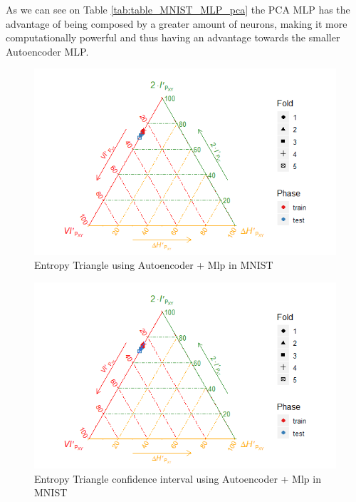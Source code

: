 As we can see on Table \ref{tab:table_MNIST_MLP_pca} the PCA MLP has the advantage of being composed by a greater amount of neurons, making it more computationally powerful and thus having an advantage towards the smaller Autoencoder MLP. 


\begin{figure}[H]
	\centering
	\includegraphics[width=1\linewidth]{Figuras_tfg/MNIST_Autoencoder_mlp}
	\caption{Entropy Triangle using Autoencoder + Mlp in MNIST}
	\label{fig:figure_Mlp_MNIST_ET_Auto}
\end{figure}

\begin{figure}[H]
	\centering
	\includegraphics[width=1\linewidth]{Figuras_tfg/MNIST_Autoencoder_mlp_Confidence}
	\caption{Entropy Triangle confidence interval using Autoencoder + Mlp in MNIST}
    \label{fig:figure_Mlp_MNIST_ET_Auto_Confidence}
\end{figure}

